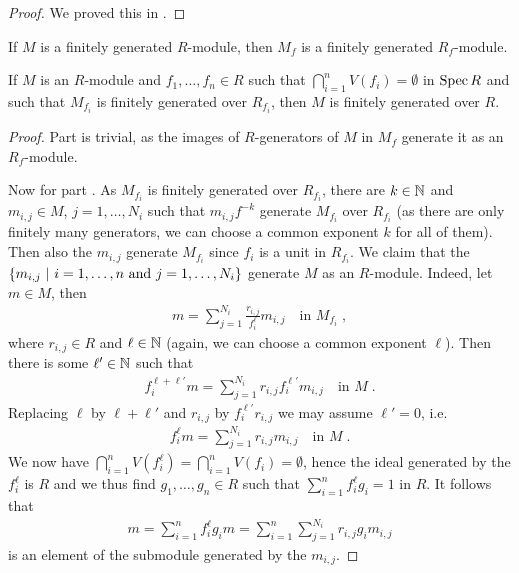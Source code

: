\documentclass[a4paper,parskip=half,numbers=enddot, DIV=12]{scrreprt}
\begin{document}
\begin{proof}
	We proved this in \cite[Lemma~2.2.2]{alggeo1}.
\end{proof}
\begin{lem}
	\begin{alphanumerate}
		\item {}If $M$ is a finitely generated $R$-module, then $M_f$ is a finitely generated $R_f$-module.
		\item If $M$ is an $R$-module and $f_1,\ldots,f_n\in R$ such that $\bigcap_{i=1}^nV(f_i)=\emptyset$ in $\operatorname{Spec} R$ and such that $M_{f_i}$ is finitely generated over $R_{f_i}$, then $M$ is finitely generated over $R$.
	\end{alphanumerate}
\end{lem}
\begin{proof}
	Part  is trivial, as the images of $R$-generators of $M$ in $M_f$ generate it as an $R_f$-module.
	
	Now for part . As $M_{f_i}$ is finitely generated over $R_{f_i}$, there are $k\in\mathbb{N}$ and $m_{i,j}\in M$, $j=1,\ldots,N_i$ such that $m_{i,j}f^{-k}$ generate $M_{f_i}$ over $R_{f_i}$ (as there are only finitely many generators, we can choose a common exponent $k$ for all of them). Then also the $m_{i,j}$ generate $M_{f_i}$ since $f_i$ is a unit in $R_{f_i}$. We claim that the $\left\{m_{i,j}\ \middle|\  i=1,\ldots, n\text{ and }j=1,\ldots, N_i\right\}$ generate $M$ as an $R$-module. Indeed, let $m\in M$, then
	\begin{align*}
		m=\sum_{j=1}^{N_i}\frac{r_{i,j}}{f_i^\ell}m_{i,j}\quad\text{in }M_{f_i}\;,
	\end{align*}
	where $r_{i,j}\in R$ and $\ell\in\mathbb{N}$ (again, we can choose a common exponent $\ell$). Then there is some $\ell'\in \mathbb{N}$ such that
	\begin{align*}
		f_i^{\ell+\ell'}m=\sum_{j=1}^{N_i}r_{i,j}f_i^{\ell'}m_{i,j}\quad\text{in }M\;.
	\end{align*}
	Replacing $\ell$ by $\ell+\ell'$ and $r_{i,j}$ by $f_i^{\ell'}r_{i,j}$ we may assume $\ell'=0$, i.e.
	\begin{align*}
		f_i^{\ell}m=\sum_{j=1}^{N_i}r_{i,j}m_{i,j}\quad\text{in }M\;.
	\end{align*}
	We now have $\bigcap_{i=1}^nV(f_i^\ell)=\bigcap_{i=1}^nV(f_i)=\emptyset$, hence the ideal generated by the $f_i^\ell$ is $R$ and we thus find $g_1,\ldots,g_n\in R$ such that $\sum_{i=1}^{n}f_i^\ell g_i=1$ in $R$. It follows that
	\begin{align*}
		m=\sum_{i=1}^nf_i^\ell g_im=\sum_{i=1}^{n}\sum_{j=1}^{N_i}r_{i,j}g_im_{i,j}
	\end{align*}
	is an element of the submodule generated by the $m_{i,j}$.
\end{proof}
\end{document}
